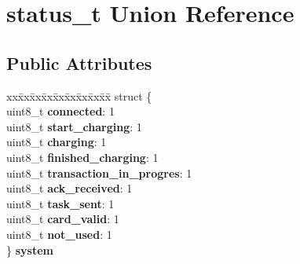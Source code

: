 \hypertarget{unionstatus__t}{\section{status\+\_\+t Union Reference}
\label{unionstatus__t}
}
\subsection*{Public Attributes}
\begin{DoxyCompactItemize}
\item 
\hypertarget{unionstatus__t_a198449e84364db92cb0b8c156651ca9d}{\begin{tabbing}
xx\=xx\=xx\=xx\=xx\=xx\=xx\=xx\=xx\=\kill
struct \{\\
\hypertarget{structstatus__t_1_1@0_aa22705551cd5f2fe9446d497ec94682b}{\>uint8\_t {\bfseries uart\_rx}: 1\\
\hypertarget{structstatus__t_1_1@0_a9ec95a29763312c3faba670d40d64df5}{\>uint8\_t {\bfseries uart\_tx}: 1\\
\hypertarget{structstatus__t_1_1@0_a91237edb1cd5f4d09392ef5553d0e72b}{\>uint8\_t {\bfseries not\_used}: 6\\
\} {\bfseries interrupt}}\label{unionstatus__t_a198449e84364db92cb0b8c156651ca9d}
\\

\end{tabbing}\item 
\hypertarget{unionstatus__t_a5ffdac9236c31094d00b78f9c18d0749}{\begin{tabbing}
xx\=xx\=xx\=xx\=xx\=xx\=xx\=xx\=xx\=\kill
struct \{\\
\hypertarget{structstatus__t_1_1@1_ab0674b9bf2c07f9b65807259e00f232b}{\>uint8\_t {\bfseries connected}: 1\\
\hypertarget{structstatus__t_1_1@1_ac0a0ed40c28215c18aacda0d8b2305b3}{\>uint8\_t {\bfseries start\_charging}: 1\\
\hypertarget{structstatus__t_1_1@1_af414739f0b4ee4ae438e8d3abc3c654e}{\>uint8\_t {\bfseries charging}: 1\\
\hypertarget{structstatus__t_1_1@1_af7696d9f75a076f19a758ac17390eb65}{\>uint8\_t {\bfseries finished\_charging}: 1\\
\hypertarget{structstatus__t_1_1@1_a941528c167e8adec565297d9d68be570}{\>uint8\_t {\bfseries transaction\_in\_progres}: 1\\
\hypertarget{structstatus__t_1_1@1_a4f2042d22f5db9018ce63113ba3226de}{\>uint8\_t {\bfseries ack\_received}: 1\\
\hypertarget{structstatus__t_1_1@1_af759c8283ccbf1cdd824340f8eb154ef}{\>uint8\_t {\bfseries task\_sent}: 1\\
\hypertarget{structstatus__t_1_1@1_af8ce736f0021a3c20d22e33f4cf1cd0a}{\>uint8\_t {\bfseries card\_valid}: 1\\
\hypertarget{structstatus__t_1_1@1_a91237edb1cd5f4d09392ef5553d0e72b}{\>uint8\_t {\bfseries not\_used}: 1\\
\} {\bfseries system}}\label{unionstatus__t_a5ffdac9236c31094d00b78f9c18d0749}
\\

}}}}}}}}
\end{tabbing}}}
\end{DoxyCompactItemize}
